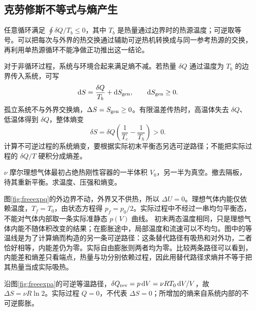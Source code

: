 \subsection{克劳修斯不等式与熵产生}
\label{th:clausius}
任意循环满足 $\oint\delta Q/T_b\le0$，其中 $T_b$ 是热量通过边界时的热源温度；可逆取等号。可以把每次与外界的热交换通过辅助可逆热机转换成与同一参考热源的交换，再利用单热源循环不能净做正功推出这一结论。

对于非循环过程，系统与环境合起来满足熵不减。若热量 $\delta Q$ 通过温度为 $T_b$ 的边界传入系统，可写
\[
 \mathop{}\!\mathrm d S=\frac{\delta Q}{T_b}+\mathop{}\!\mathrm d S_{\rm gen},\qquad \mathop{}\!\mathrm d S_{\rm gen}\ge0.
\]
孤立系统不与外界交换熵，$\Delta S= S_{\rm gen}\ge0$。有限温差传热时，高温体失去 $\delta Q$、低温体得到 $\delta Q$，整体熵变
\[
 \delta S=\delta Q\left(\frac1{T_c}-\frac1{T_h}\right)>0.
\]
计算不可逆过程的系统熵变，要根据实际初末平衡态另选可逆路径；不能把实际过程的 $\delta Q/T$ 硬积分成熵差。


\begin{example}[自由膨胀为何熵增]\label{ex:freeexpansion}
$\nu$ 摩尔理想气体最初占绝热刚性容器的一半体积 $V_0$，另一半为真空。撤去隔板，待其重新平衡。求温度、压强和熵变。
\end{example}
\begin{solution}
图\ref{fig:freeexpq}的外边界不动，外界又不供热，所以 $\Delta U=0$。理想气体内能仅依赖温度，$T_f=T_0$，由状态方程得 $p_f=p_0/2$。实际过程中不经过一串均匀平衡态，不能对气体内部取一条实际准静态 $p(V)$ 曲线。
初末两态温度相同，只是理想气体内能不随体积改变的结果；在膨胀途中，局部温度和流速可以不均匀。图中的等温线是为了计算熵而构造的另一条可逆路径：这条替代路径有吸热和对外功，二者恰好相等，内能差仍为零。实际自由膨胀则两者均为零。比较两条路径可以看到，内能差和熵差只看端点，热量与功分别依赖过程，因此用替代路径求熵并不等于把其热量当成实际吸热。

沿图\ref{fig:freeexpa}的可逆等温路径，$\delta Q_{\rm rev}=p\mathop{}\!\mathrm d V=\nu RT_0\mathop{}\!\mathrm d V/V$，故 $\Delta S=\nu R\ln2$。实际过程 $Q=0$，不代表 $\Delta S=0$；所增加的熵来自系统内部的不可逆膨胀。
\end{solution}

